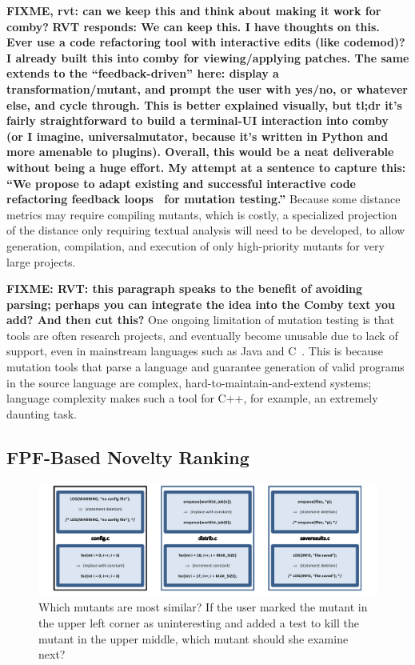  \textbf{FIXME, rvt: can we keep this
  and think about making it work for comby?}
\textbf{RVT responds: We can keep this. I have thoughts on this. Ever use a code refactoring tool with interactive edits (like codemod)? I already built this into comby for viewing/applying patches. The same extends to the ``feedback-driven'' here: display a transformation/mutant, and prompt the user with yes/no, or whatever else, and cycle through. This is better explained visually, but tl;dr it's fairly straightforward to build a terminal-UI interaction into comby (or I imagine, universalmutator, because it's written in Python and more amenable to plugins). Overall, this would be a neat deliverable without being a huge effort. My attempt at a sentence to capture this:  ``We propose to adapt existing and successful interactive code refactoring feedback loops~\cite{FB Codemod, comby, dart codemod} for mutation testing.''}
 Because some distance
metrics may require compiling mutants, which is costly, a specialized
projection of the distance only requiring textual analysis will need
to be developed, to allow generation, compilation, and execution of
only high-priority mutants for very large projects.

\textbf{FIXME: RVT: this paragraph speaks to the benefit of avoiding parsing;
  perhaps you can integrate the idea into the Comby text you add? And then cut this?}
One ongoing limitation of mutation testing is that tools are often research
projects, and eventually become unusable due to lack of support, even in
mainstream languages such as Java and C~\cite{MutChoice}.
This is because mutation tools that parse a language and guarantee generation of
valid programs in the source language are complex, hard-to-maintain-and-extend
systems; language complexity makes such a tool for C++, for example, an
extremely daunting task.

\subsection{FPF-Based Novelty Ranking}
\label{sec:fpfplan}

\begin{figure}[t]
\centering
\includegraphics[width=0.95\columnwidth]{distmetric}

\caption{Which mutants are most similar?  If the user marked the
  mutant in the upper left corner as uninteresting and added a test
  to kill the
  mutant in the upper middle, which mutant
  should she examine next?}
\label{fig:distances}
\end{figure}


